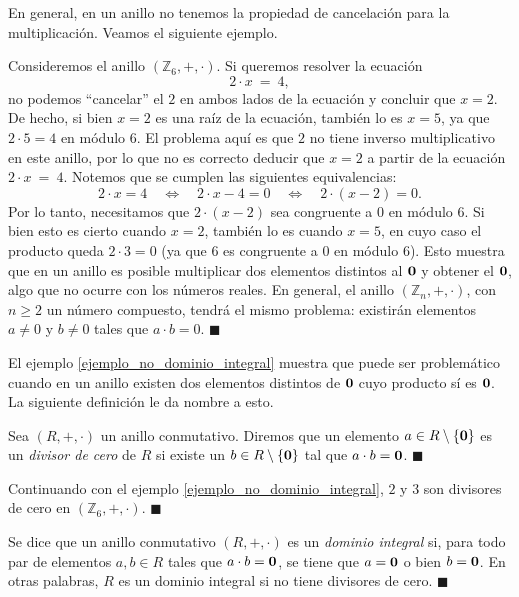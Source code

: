 En general, en un anillo no tenemos la propiedad de cancelación para la multiplicación. Veamos el siguiente ejemplo.

\begin{example} \label{ejemplo_no_dominio_integral}
Consideremos el anillo $(\mathbb{Z}_6,+,\cdot)$. Si
queremos resolver la ecuación $$ 2\cdot x\ = \ 4,$$ no podemos
``cancelar'' el $2$ en ambos lados de la ecuación y concluir que $x =
2$. De hecho, si bien $x =2$ es una raíz de la ecuación, también lo es $x=5$, ya que $2 \cdot 5 = 4$ en módulo $6$. El problema aquí es que $2$ no tiene inverso multiplicativo en este anillo, por lo que no es correcto deducir que $x=2$ a partir de la ecuación $ 2\cdot x\ = \ 4$. Notemos que se cumplen las siguientes equivalencias:
$$2 \cdot x = 4 \quad
 \Leftrightarrow \quad 2 \cdot x - 4 = 0 \quad \Leftrightarrow \quad 2 \cdot (x - 2) = 0.$$
Por lo tanto, necesitamos que $2 \cdot (x-2)$ sea congruente a $0$ en módulo $6$. Si bien esto es cierto cuando $x=2$, también lo es cuando $x=5$, en cuyo caso el producto queda $2 \cdot 3 = 0$ (ya que $6$ es congruente a $0$ en módulo $6$). Esto muestra que en un anillo es posible multiplicar dos elementos distintos al $\mathbf{0}$ y obtener el $\mathbf{0}$, algo que no ocurre con los números reales. En general, el anillo $(\mathbb{Z}_n,+,\cdot)$, con $n \geq 2$ un número compuesto, tendrá el mismo problema: existirán elementos $a\neq 0$ y $b\neq 0$
tales que $a\cdot b = 0$.
 \hfill$\blacksquare$
\end{example}

El ejemplo \ref{ejemplo_no_dominio_integral} muestra que puede ser problemático cuando en un anillo existen dos elementos distintos de $\mathbf{0}$ cuyo producto sí es $\mathbf{0}$. La siguiente definición le da nombre a esto.

\begin{definition} \label{def_divisores_de_cero}
Sea $(R, +, \cdot)$ un anillo conmutativo. Diremos que un elemento $a \in R \setminus \{\mathbf{0}\}$ es un \emph{divisor de cero} de $R$ si existe un $b \in R \setminus \{\mathbf{0}\}$ tal que $a \cdot b = \mathbf{0}$.
\hfill$\blacksquare$
\end{definition}

\begin{example} 
Continuando con el ejemplo \ref{ejemplo_no_dominio_integral}, $2$ y $3$ son divisores de cero en $(\mathbb{Z}_6, +, \cdot)$.
\hfill$\blacksquare$
\end{example}

\begin{definition}
Se dice que un anillo conmutativo $(R, +, \cdot)$ es un \emph{dominio integral} si, para todo par de elementos $a, b \in R$ tales que $a \cdot b = \mathbf{0}$, se tiene que $a = \mathbf{0}$ o bien $b = \mathbf{0}$. En otras palabras, $R$ es un dominio integral si no tiene divisores de cero. \hfill$\blacksquare$
\end{definition}

